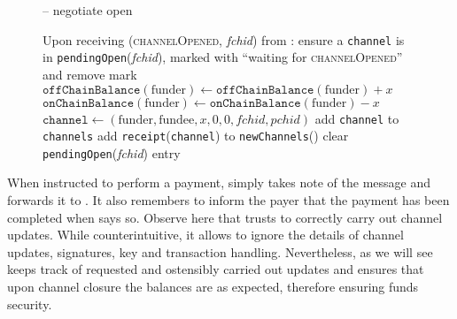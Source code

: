 \begin{figure}[H]
\begin{systembox}{\fpaynet{} -- negotiate open}
\begin{algorithmic}[1]
        \State Upon receiving (\textsc{channelOpened}, \textit{fchid}) from
        \simulator:
        \Indent
          \State ensure a \texttt{channel} is in
          \texttt{pendingOpen}(\textit{fchid}), marked with ``waiting for
          \textsc{channelOpened}'' and remove mark
          \State $\mathtt{offChainBalance}\left(\mathrm{funder}\right)
          \gets \mathtt{offChainBalance}\left(\mathrm{funder}\right) +
          x$
          \label{alg:fpaynet:channelOpened:offchain}
          \State $\mathtt{onChainBalance}\left(\mathrm{funder}\right)
          \gets \mathtt{onChainBalance}\left(\mathrm{funder}\right) -
          x$
          \label{alg:fpaynet:channelOpened:onchain}
          \State $\mathtt{channel} \gets \left(\mathrm{funder}, \mathrm{fundee},
          x, 0, 0, \mathit{fchid}, \mathit{pchid}\right)$
          \State add \texttt{channel} to \texttt{channels}
          \State add \texttt{receipt}(\texttt{channel}) to
          \texttt{newChannels}(\alice)
          \label{alg:fpaynet:channelOpened:report}
          \State clear \texttt{pendingOpen}(\textit{fchid}) entry
        \EndIndent
      \end{algorithmic}
    \end{systembox}
    \caption{}
    \label{alg:fpaynet:open:negotiate}
  \end{figure}

  When instructed to perform a payment, \fpaynet{} simply takes note of the
  message and forwards it to \simulator. It also remembers to inform the payer
  that the payment has been completed when \simulator{} says so. Observe here
  that \fpaynet{} trusts \simulator{} to correctly carry out channel updates.
  While counterintuitive, it allows \fpaynet{} to ignore the details of channel
  updates, signatures, key and transaction handling. Nevertheless, as we will
  see \fpaynet{} keeps track of requested and ostensibly carried out updates and
  ensures that upon channel closure the balances are as expected, therefore
  ensuring funds security.

